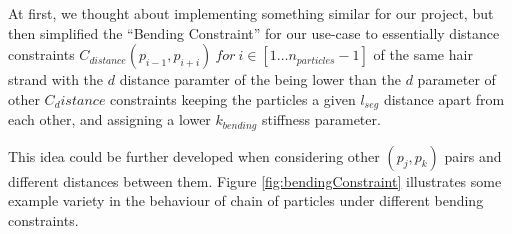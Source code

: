\documentclass[sigplan,screen,nonacm]{acmart}
\begin{document}
At first, we thought about implementing something similar for our project, but
then simplified the ``Bending Constraint'' for our use-case to essentially
 distance constraints $C_{distance}(p_{i-1}, p_{i+i})~for~i\in[1 \ldots
n_{particles}-1]$ of the same hair strand with the $d$ distance paramter of the
being lower than the $d$ parameter of other $C_distance$ constraints keeping the
particles a given $l_{seg}$ distance apart from each other, and assigning
a lower $k_{bending}$ stiffness parameter.

This idea could be further developed when considering other $(p_j,p_k)$ pairs
and different distances between them. Figure \ref{fig:bendingConstraint}
illustrates some example variety in the behaviour of chain of particles under
different bending constraints.

\newcommand{\simulationDetails}[3]{\emph{$nr_{seg}=#1$, $l_{seg}=#2$, $k=#3$}}
\end{document}
